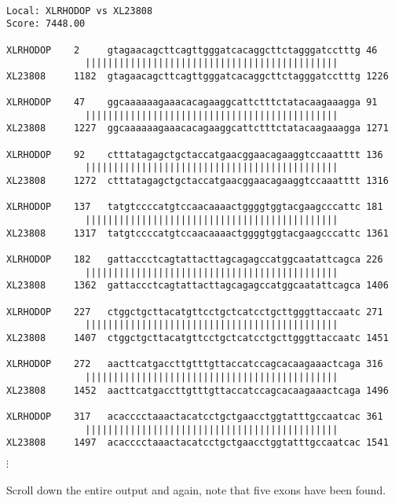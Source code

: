 \documentclass[12pt]{report}
\begin{document}
\unix{}\\
\\
\\
\\
\\
\\

\unix{}
\begin{verbatim}
Local: XLRHODOP	vs XL23808
Score: 7448.00

XLRHODOP	2     gtagaacagcttcagttgggatcacaggcttctagggatcctttg 46
		      |||||||||||||||||||||||||||||||||||||||||||||
XL23808		1182  gtagaacagcttcagttgggatcacaggcttctagggatcctttg 1226

XLRHODOP	47    ggcaaaaaagaaacacagaaggcattctttctatacaagaaagga 91
		      |||||||||||||||||||||||||||||||||||||||||||||
XL23808		1227  ggcaaaaaagaaacacagaaggcattctttctatacaagaaagga 1271

XLRHODOP	92    ctttatagagctgctaccatgaacggaacagaaggtccaaatttt 136
		      |||||||||||||||||||||||||||||||||||||||||||||
XL23808		1272  ctttatagagctgctaccatgaacggaacagaaggtccaaatttt 1316

XLRHODOP	137   tatgtccccatgtccaacaaaactggggtggtacgaagcccattc 181
		      |||||||||||||||||||||||||||||||||||||||||||||
XL23808		1317  tatgtccccatgtccaacaaaactggggtggtacgaagcccattc 1361

XLRHODOP	182   gattaccctcagtattacttagcagagccatggcaatattcagca 226
		      |||||||||||||||||||||||||||||||||||||||||||||
XL23808		1362  gattaccctcagtattacttagcagagccatggcaatattcagca 1406

XLRHODOP	227   ctggctgcttacatgttcctgctcatcctgcttgggttaccaatc 271
		      |||||||||||||||||||||||||||||||||||||||||||||
XL23808		1407  ctggctgcttacatgttcctgctcatcctgcttgggttaccaatc 1451

XLRHODOP	272   aacttcatgaccttgtttgttaccatccagcacaagaaactcaga 316
		      |||||||||||||||||||||||||||||||||||||||||||||
XL23808		1452  aacttcatgaccttgtttgttaccatccagcacaagaaactcaga 1496

XLRHODOP	317   acacccctaaactacatcctgctgaacctggtatttgccaatcac 361
		      |||||||||||||||||||||||||||||||||||||||||||||
XL23808		1497  acacccctaaactacatcctgctgaacctggtatttgccaatcac 1541
\end{verbatim}
$\vdots$
\\
\\
\noindent Scroll down the entire output	and again, note	that five exons	have been found.
\end{document}
